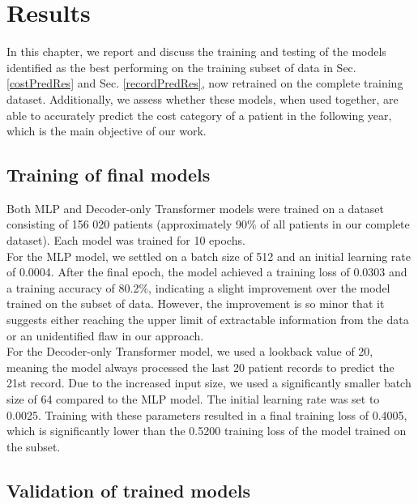 
\chapter{Results} \label{chap:results}

In this chapter, we report and discuss the training and testing of the models identified as the best performing on the training subset of data in Sec. \ref{costPredRes} and Sec. \ref{recordPredRes}, now retrained on the complete training dataset. Additionally, we assess whether these models, when used together, are able to accurately predict the cost category of a patient in the following year, which is the main objective of our work.

\section{Training of final models}
\label{modelTrain}

Both MLP and Decoder-only Transformer models were trained on a dataset consisting of 156 020 patients (approximately 90\% of all patients in our complete dataset). Each model was trained for 10 epochs.
\\

For the MLP model, we settled on a batch size of 512 and an initial learning rate of 0.0004. After the final epoch, the model achieved a training loss of 0.0303 and a training accuracy of 80.2\%, indicating a slight improvement over the model trained on the subset of data. However, the improvement is so minor that it suggests either reaching the upper limit of extractable information from the data or an unidentified flaw in our approach.
\\

For the Decoder-only Transformer model, we used a lookback value of 20, meaning the model always processed the last 20 patient records to predict the 21st record. Due to the increased input size, we used a significantly smaller batch size of 64 compared to the MLP model. The initial learning rate was set to 0.0025. Training with these parameters resulted in a final training loss of 0.4005, which is significantly lower than the 0.5200 training loss of the model trained on the subset.

\section{Validation of trained models}
\label{modelValid}

